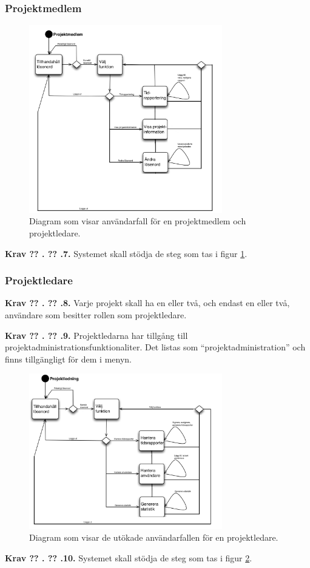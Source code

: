 \documentclass[a4paper]{article}
\newcommand\getcurrentref[1]{%
 \ifnumequal{\value{#1}}{0}
  {??}
  {\the\value{#1}}%
}
\newcommand\requirement[2]{
	\numberedrow{Krav}{#1}{#2}
}
\newcommand\numberedrow[3]{
	\noindent
	\textbf{#1 \getcurrentref{section}.\getcurrentref{subsection}.#2.} #3
	
}
\begin{document}
		\subsubsection*{Projektmedlem}		
			\begin{figure}[H]
				\centering
				\includegraphics[width=0.75\textwidth]{flow_common_proj_mem}
				\caption{Diagram som visar användarfall för en projektmedlem och projektledare.}
				\label{image_gen_promed}
			\end{figure}
		\requirement{7}{Systemet skall stödja de steg som tas i figur \ref{image_gen_promed}.}
		\subsubsection*{Projektledare}
		\requirement{8}{Varje projekt skall ha en eller två, och endast en eller två, användare som besitter rollen som projektledare.}
		\requirement{9}{Projektledarna har tillgång till projektadministrationsfunktionaliter. Det listas som ``projektadministration'' och finns tillgängligt för dem i menyn.}
			\begin{figure}[H]
				\centering
				\includegraphics[width=0.75\textwidth]{flow_common_proj_leader}
				\caption{Diagram som visar de utökade användarfallen för en projektledare.}
				\label{image_gen_proboss}
			\end{figure}
		\requirement{10}{Systemet skall stödja de steg som tas i figur \ref{image_gen_proboss}.}
\end{document}
